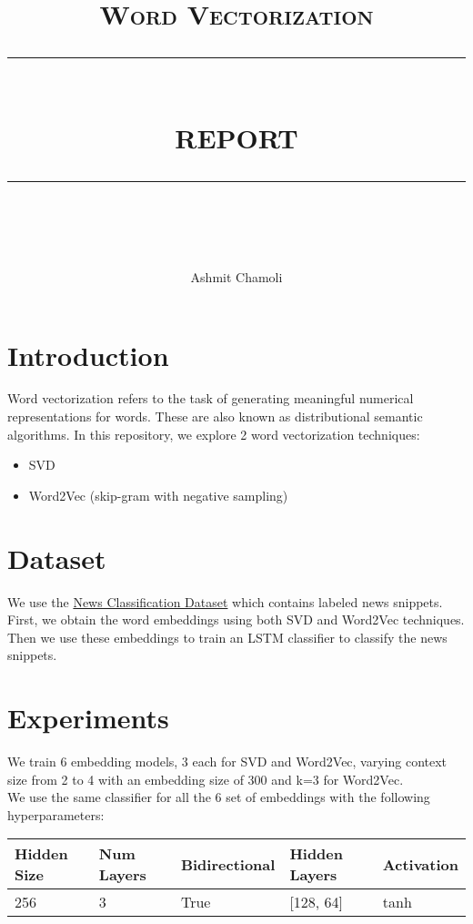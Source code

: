 \documentclass[a4paper,9pt]{report}
\newcommand{\HRule}[1]{\rule{\linewidth}{#1}}
\begin{document}
\title{ \normalsize \textsc{\LARGE Word Vectorization}
		\\ [2.0cm]
		\HRule{0.5pt} \\
		\LARGE \textbf{\uppercase{Report}}
		\HRule{2pt} \\ [0.5cm]
		\normalsize \vspace*{3\baselineskip}}
        \date{ }

\author{Ashmit Chamoli\\ }

\maketitle
\section*{Introduction}
Word vectorization refers to the task of generating meaningful numerical representations for words. These are also known as distributional semantic algorithms.
In this repository, we explore 2 word vectorization techniques:
\begin{itemize}
    \item SVD
    \item Word2Vec (skip-gram with negative sampling)
\end{itemize}

\section*{Dataset}
We use the \href{https://iiitaphyd-my.sharepoint.com/:u:/g/personal/advaith_malladi_research_iiit_ac_in/EWjgIboHC19Ppq6Of9klUo4BlKgAqynxC0TRBURzQ0lEzA?e=tWZqY5}{News Classification Dataset} which contains labeled news snippets. 
First, we obtain the word embeddings using both SVD and Word2Vec techniques. 
Then we use these embeddings to train an LSTM classifier to classify the news snippets.

\section*{Experiments}
We train 6 embedding models, 3 each for SVD and Word2Vec, varying context size from 2 to 4 with an embedding size of 300 and k=3 for Word2Vec.
\\
We use the same classifier for all the 6 set of embeddings with the following hyperparameters:
\begin{table}[H]
    \centering
    \begin{tabular}{|l|l|l|l|l|}
        \hline
        \textbf{Hidden Size} & \textbf{Num Layers} & \textbf{Bidirectional} & \textbf{Hidden Layers} & \textbf{Activation} \\ \hline
        256 & 3 & True & [128, 64] & tanh \\ \hline
    \end{tabular}
\end{table}
\end{document}
